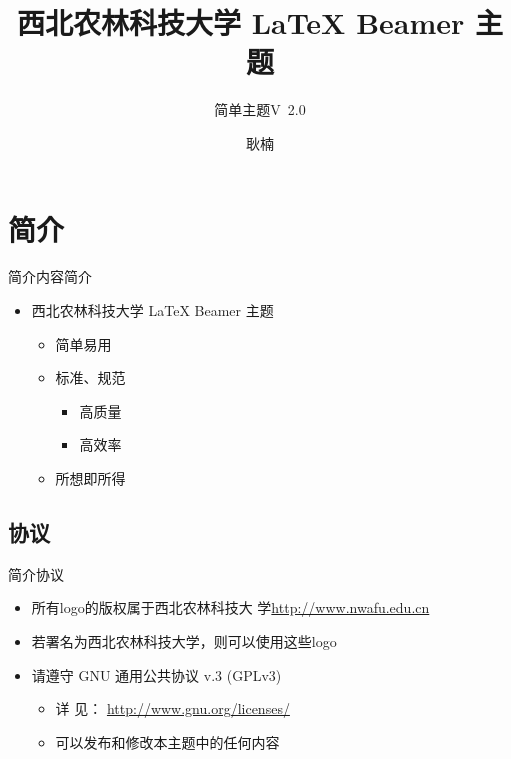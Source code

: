 \documentclass[xcolor=svgnames, t, aspectratio=169]{ctexbeamer}
\title[简单主题] %
{西北农林科技大学 {\LaTeX} Beamer 主题}
\subtitle{简单主题V\ 2.0} %
\date{\tosemester} %
\author[N. Geng] %
{耿楠}
\institute[智能媒体实验室] %
{%
  \cie
  
}
\begin{document}
{\nwafuwavesbg%
\begin{frame} %
  \titlepage
\end{frame}
}

\section{简介}
\begin{frame}{简介}{内容简介}
  \begin{itemize}
  \item 西北农林科技大学 {\LaTeX} \alert{Beamer 主题}
    \begin{itemize}
    \item 简单易用
    \item 标准、规范
      \begin{itemize}
      \item 高质量
      \item 高效率
      \end{itemize}
    \item \alert{所想即所得}
    \end{itemize}
  \end{itemize}
\end{frame}

\subsection{协议}
\begin{frame}{简介}{协议}
  \begin{itemize}
  \item 所有logo的版权属于西北农林科技大
    学\href{http://www.nwafu.edu.cn}{http://www.nwafu.edu.cn}
  \item 若署名为西北农林科技大学，则可以使用这些logo
  \item 请遵守 GNU 通用公共协议 v.3 (GPLv3)
    \begin{itemize}
    \item 详
      见：
      \href{http://www.gnu.org/licenses/}{http://www.gnu.org/licenses/}
    \item 可以发布和修改本主题中的任何内容
    \end{itemize}
  \end{itemize}
\end{frame}
\end{document}

